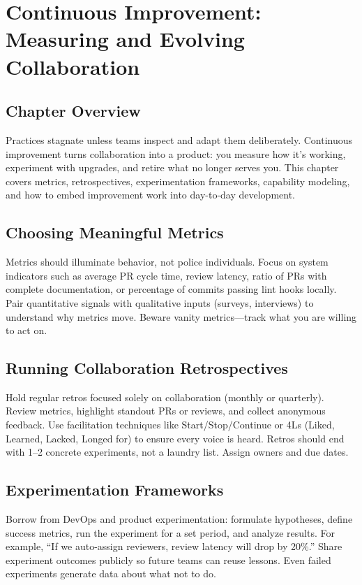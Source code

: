 \chapter{Continuous Improvement: Measuring and Evolving Collaboration}

\section{Chapter Overview}
Practices stagnate unless teams inspect and adapt them deliberately. Continuous improvement turns collaboration into a product: you measure how it's working, experiment with upgrades, and retire what no longer serves you. This chapter covers metrics, retrospectives, experimentation frameworks, capability modeling, and how to embed improvement work into day-to-day development.

\section{Choosing Meaningful Metrics}
Metrics should illuminate behavior, not police individuals. Focus on system indicators such as average PR cycle time, review latency, ratio of PRs with complete documentation, or percentage of commits passing lint hooks locally. Pair quantitative signals with qualitative inputs (surveys, interviews) to understand why metrics move. Beware vanity metrics---track what you are willing to act on.

\section{Running Collaboration Retrospectives}
Hold regular retros focused solely on collaboration (monthly or quarterly). Review metrics, highlight standout PRs or reviews, and collect anonymous feedback. Use facilitation techniques like Start/Stop/Continue or 4Ls (Liked, Learned, Lacked, Longed for) to ensure every voice is heard. Retros should end with 1--2 concrete experiments, not a laundry list. Assign owners and due dates.

\section{Experimentation Frameworks}
Borrow from DevOps and product experimentation: formulate hypotheses, define success metrics, run the experiment for a set period, and analyze results. For example, ``If we auto-assign reviewers, review latency will drop by 20\%.'' Share experiment outcomes publicly so future teams can reuse lessons. Even failed experiments generate data about what not to do.


